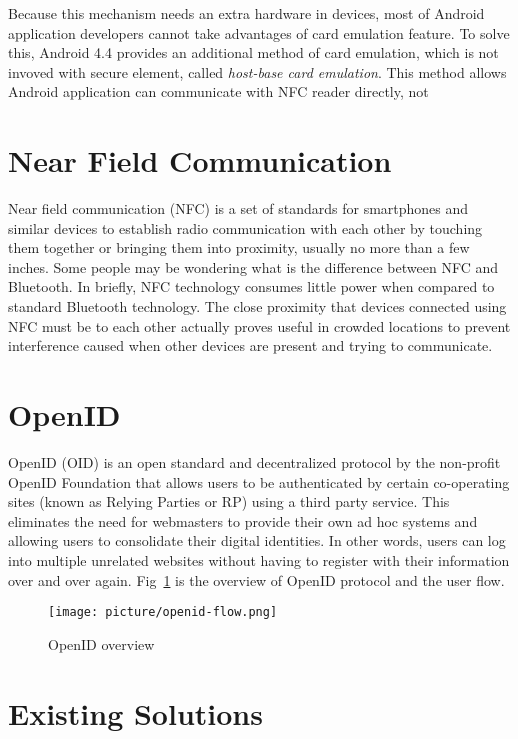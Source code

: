 \begin{CJK}{Bg5}{bsmi}
Because this mechanism needs an extra hardware in devices, most of Android application developers cannot take advantages of card emulation feature. To solve this, Android 4.4 provides an additional method of card emulation, which is not invoved with secure element, called \emph{host-base card emulation}. This method allows Android application can communicate with NFC reader directly, not 

\section{Near Field Communication}

Near field communication (NFC)\cite{nfc-wiki} is a set of standards for smartphones and similar devices to establish radio communication with each other by touching them together or bringing them into proximity, usually no more than a few inches. Some people may be wondering what is the difference between NFC and Bluetooth. In briefly, NFC technology consumes little power when compared to standard Bluetooth technology\cite{nfc-ble-1}\cite{nfc-ble-2}. The close proximity that devices connected using NFC must be to each other actually proves useful in crowded locations to prevent interference caused when other devices are present and trying to communicate. 

\section{OpenID}

OpenID (OID)\cite{openid} is an open standard and decentralized protocol by the non-profit OpenID Foundation that allows users to be authenticated by certain co-operating sites (known as Relying Parties or RP) using a third party service. This eliminates the need for webmasters to provide their own ad hoc systems and allowing users to consolidate their digital identities. In other words, users can log into multiple unrelated websites without having to register with their information over and over again. Fig~\ref{fig:openid-flow} is the overview of OpenID protocol and the user flow.
\begin{figure}
\centering
\texttt{[image: picture/openid-flow.png]}
\caption{OpenID overview\cite{openid-flow}}
\label{fig:openid-flow}
\end{figure}

\section{Existing Solutions}


\end{CJK}
